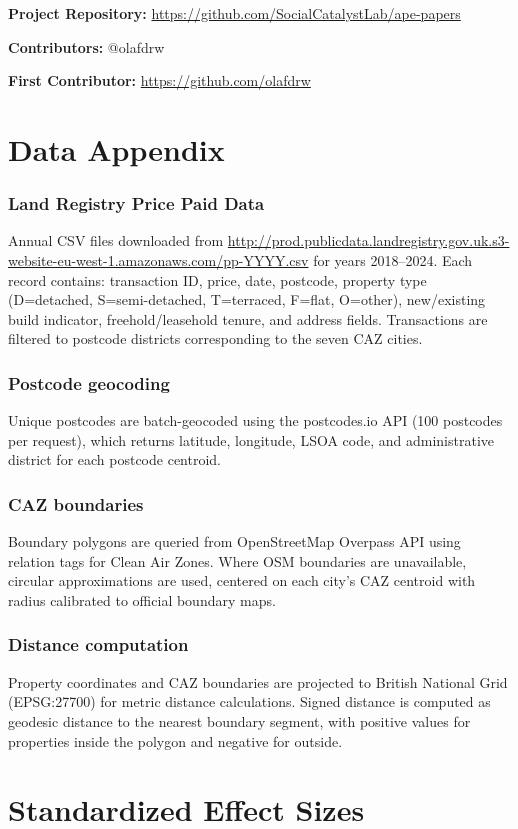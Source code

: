 \documentclass[12pt]{article}
\begin{document}
\noindent\textbf{Project Repository:} \url{https://github.com/SocialCatalystLab/ape-papers}

\noindent\textbf{Contributors:} @olafdrw

\noindent\textbf{First Contributor:} \url{https://github.com/olafdrw}

\label{apep_main_text_end}
\newpage


\newpage
\appendix

\section{Data Appendix}\label{app:data}

\subsubsection*{Land Registry Price Paid Data} Annual CSV files downloaded from \url{http://prod.publicdata.landregistry.gov.uk.s3-website-eu-west-1.amazonaws.com/pp-YYYY.csv} for years 2018--2024. Each record contains: transaction ID, price, date, postcode, property type (D=detached, S=semi-detached, T=terraced, F=flat, O=other), new/existing build indicator, freehold/leasehold tenure, and address fields. Transactions are filtered to postcode districts corresponding to the seven CAZ cities.

\subsubsection*{Postcode geocoding} Unique postcodes are batch-geocoded using the postcodes.io API (100 postcodes per request), which returns latitude, longitude, LSOA code, and administrative district for each postcode centroid.

\subsubsection*{CAZ boundaries} Boundary polygons are queried from OpenStreetMap Overpass API using relation tags for Clean Air Zones. Where OSM boundaries are unavailable, circular approximations are used, centered on each city's CAZ centroid with radius calibrated to official boundary maps.

\subsubsection*{Distance computation} Property coordinates and CAZ boundaries are projected to British National Grid (EPSG:27700) for metric distance calculations. Signed distance is computed as geodesic distance to the nearest boundary segment, with positive values for properties inside the polygon and negative for outside.

\section{Standardized Effect Sizes}\label{sec:sde}


\end{document}
